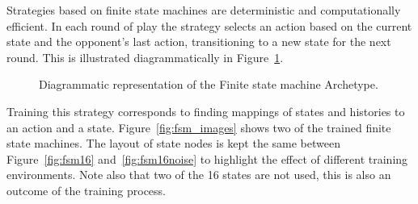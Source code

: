 \documentclass{article}
\begin{document}
Strategies based on finite state machines are deterministic and computationally efficient.
In each round of play the strategy selects an action based on the current state
and the opponent's last action, transitioning to a new state for the next round.
This is illustrated diagrammatically in Figure~\ref{fig:fsm}.

\begin{figure}[!hbtp]
    \centering
    
    \caption{Diagrammatic representation of the Finite state machine Archetype.}
    \label{fig:fsm}
\end{figure}

Training this strategy corresponds to finding mappings of states and histories
to an action and a state. Figure~\ref{fig:fsm_images} shows two of the trained
finite state machines. The layout of state nodes is kept the same between
Figure~\ref{fig:fsm16} and~\ref{fig:fsm16noise} to highlight the effect of
different training environments. Note also that two of the 16 states are not
used, this is also an outcome of the training process.
\end{document}
